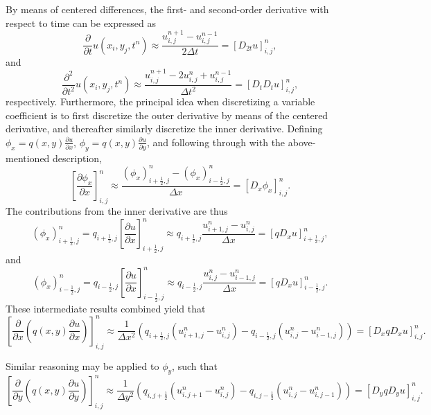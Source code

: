 \documentclass[twoside]{article}
\begin{document}
By means of centered differences, the first- and second-order derivative with respect to time can be expressed as
\begin{equation*}
\frac{\partial}{\partial t} u(x_i, y_j, t^n) \approx \frac{u_{i,j}^{n+1} - u_{i,j}^{n-1}}{2\Delta t} = [D_{2t} u]_{i,j}^n,
\end{equation*}
and
\begin{equation*}
\frac{\partial^2}{\partial t^2} u(x_i, y_j, t^n) \approx \frac{u_{i,j}^{n+1} - 2u_{i,j}^n + u_{i,j}^{n-1}} {\Delta t^2} = \left[D_t D_t u \right]_{i,j}^n,
\end{equation*}
respectively. Furthermore, the principal idea when discretizing a variable coefficient is to first discretize the outer derivative by means of the centered derivative, and thereafter similarly discretize the inner derivative.
Defining $\phi_x = q(x,y) \frac{\partial u}{\partial x}$, $\phi_y = q(x,y) \frac{\partial u}{\partial y}$, and following through with the above-mentioned description,
\begin{equation*}
\left[\frac{\partial \phi_x}{\partial x} \right]_{i,j}^n \approx \frac{(\phi_x)_{i + \frac{1}{2}, j}^n - (\phi_x)_{i-\frac{1}{2}, j}^n}{\Delta x} = [D_x \phi_x]_{i,j}^n.
\end{equation*}
The contributions from the inner derivative are thus
\begin{equation*}
(\phi_x)_{i + \frac{1}{2}, j}^n = q_{i + \frac{1}{2}, j} \left[\frac{\partial u}{\partial x} \right]_{i + \frac{1}{2}, j}^n \approx q_{i + \frac{1}{2}, j} \frac{u_{i + 1, j}^n - u_{i,j}^n}{\Delta x} = [qD_x u]_{i + \frac{1}{2}, j}^n,
\end{equation*}
and
\begin{equation*}
(\phi_x)_{i - \frac{1}{2}, j}^n = q_{i - \frac{1}{2}, j} \left[\frac{\partial u}{\partial x} \right]_{i - \frac{1}{2}, j}^n \approx q_{i - \frac{1}{2}, j} \frac{u_{i , j}^n - u_{i-1,j}^n}{\Delta x} = [qD_x u]_{i - \frac{1}{2}, j}^n.
\end{equation*}
These intermediate results combined yield that
\begin{equation*}
\left[ \frac{\partial}{\partial x} \left (q(x,y) \frac{\partial u}{\partial x} \right) \right]_{i,j}^n \approx \frac{1}{\Delta x^2} \left(q_{i+\frac{1}{2}, j} (u_{i+1,j}^n - u_{i,j}^n) - q_{i-\frac{1}{2}, j}(u_{i,j}^n - u_{i-1,j}^n) \right)
= \left[D_x q D_x u \right]_{i,j}^n.
\end{equation*}

Similar reasoning may be applied to $\phi_y$, such that
\begin{equation*}
\left[ \frac{\partial}{\partial y} \left (q(x,y) \frac{\partial u}{\partial y} \right) \right]_{i,j}^n \approx \frac{1}{\Delta y^2} \left(q_{i, j+ \frac{1}{2}} (u_{i,j+1}^n - u_{i,j}^n) - q_{i, j-\frac{1}{2}}(u_{i,j}^n - u_{i,j-1}^n) \right)
= \left[D_y q D_y u \right]_{i,j}^n.
\end{equation*}
\end{document}

